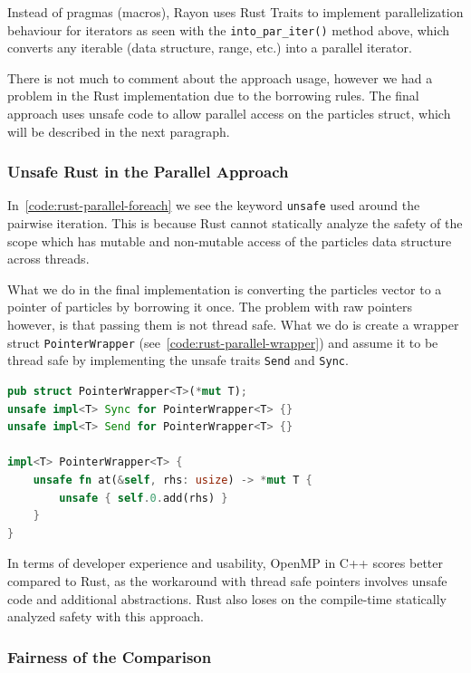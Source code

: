 \documentclass[11pt,
               a4paper,
               bibtotoc,
               idxtotoc,
               headsepline,
               footsepline,
               footexclude,
               BCOR12mm,
               DIV13,
               openany,   %
               ]
               {scrbook}
\begin{document}
Instead of pragmas (macros), Rayon uses Rust Traits to implement parallelization behaviour for iterators as seen with the \texttt{into\_par\_iter()} method above, which converts any iterable (data structure, range, etc.) into a parallel iterator.

There is not much to comment about the approach usage, however we had a problem in the Rust implementation due to the borrowing rules. The final approach uses unsafe code to allow parallel access on the particles struct, which will be described in the next paragraph.

\subsubsection{Unsafe Rust in the Parallel Approach}

In~\autoref{code:rust-parallel-foreach} we see the keyword \texttt{unsafe} used around the pairwise iteration. This is because Rust cannot statically analyze the safety of the scope which has mutable and non-mutable access of the particles data structure across threads.

What we do in the final implementation is converting the particles vector to a pointer of particles by borrowing it once. The problem with raw pointers however, is that passing them is not thread safe. What we do is create a wrapper struct \texttt{PointerWrapper} (see~\ref{code:rust-parallel-wrapper}) and assume it to be thread safe by implementing the unsafe traits \texttt{Send} and \texttt{Sync}.

\vspace{0.5em}
\begin{lstlisting}[style=eclipse-rust, language=Rust, basicstyle=\ttfamily\small, caption={The definition of the \texttt{PointerWrapper} struct in Rust.}, label=code:rust-parallel-wrapper]
pub struct PointerWrapper<T>(*mut T);
unsafe impl<T> Sync for PointerWrapper<T> {}
unsafe impl<T> Send for PointerWrapper<T> {}

impl<T> PointerWrapper<T> {
    unsafe fn at(&self, rhs: usize) -> *mut T {
        unsafe { self.0.add(rhs) }
    }
}
\end{lstlisting}

In terms of developer experience and usability, OpenMP in C++ scores better compared to Rust, as the workaround with thread safe pointers involves unsafe code and additional abstractions. Rust also loses on the compile-time statically analyzed safety with this approach.

\subsubsection{Fairness of the Comparison}
\end{document}
